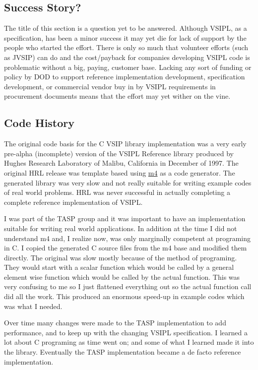 \subsection*{Success Story?}
The title of this section is a question yet to be answered. Although VSIPL, as a specification, has been a minor success it may yet die for lack of support by the people who started the effort. There is only so much that volunteer efforts (such as JVSIP) can do and the cost/payback for companies developing VSIPL code is problematic without a big, paying, customer base.  Lacking any sort of funding or policy by DOD to support reference implementation development, specification development, or commercial vendor buy in by VSIPL requirements in procurement documents means that the effort may yet wither on the vine. 
\subsection*{Code History}
The original code basis for the C VSIP library implementation was a very early pre-alpha (incomplete) version of the VSIPL Reference library produced by Hughes Research Laboratory of Malibu, California in December of 1997. The original HRL release was template based using \href{https://www.gnu.org/software/m4/m4.html}{{m4}} as a code generator. The generated library was very slow and not really suitable for writing example codes of real world problems.  HRL was never successful in actually completing a complete reference implementation of VSIPL.

I was part of the TASP group and it was important to have an implementation suitable for writing real world applications.  In addition at the time I did not understand m4 and, I realize now, was only marginally competent at programing in C. I copied the generated C source files from the m4 base and modified them directly. The original was slow mostly because of the method of programing. They would start with a scalar function which would be called by a general element wise function which would be called by the actual function. This was very confusing to me so I just flattened everything out so the actual function call did all the work. This produced an enormous speed-up in example codes which was what I needed.

Over time many changes were made to the TASP implementation to add performance, and to keep up with the changing VSIPL specification. I learned a lot about C programing as time went on; and some of what I learned made it into the library. Eventually the TASP implementation became a de facto reference implementation.

